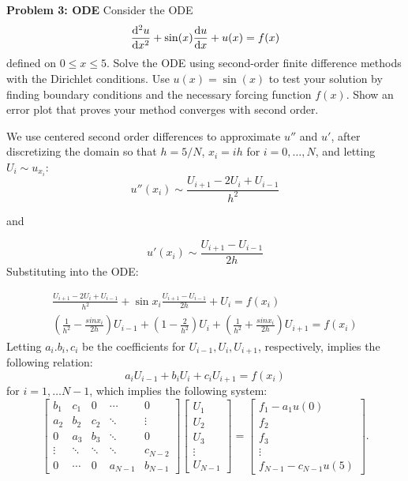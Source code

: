 \documentclass[12pt]{article}
\begin{document}
\noindent \textbf{Problem 3: ODE}
Consider the ODE
$$\dv[2]{u}{x} + \sin(x) \dv{u}{x} + u(x) = f(x)$$
defined on $0 \leq x \leq 5$. Solve the ODE using second-order finite difference methods with the Dirichlet conditions. Use $u(x) = \sin(x)$ to test your solution by finding boundary conditions and the necessary forcing function $f(x)$. Show an error plot that proves your method converges with second order.

We use centered second order differences to approximate $u''$ and $u'$, after discretizing the domain so that $h = 5/N$, $x_{i} = ih$ for $i = 0,\dots, N$, and letting $U_{i} \sim u_{x_{i}}$:
\[
  u''(x_{i}) \sim \frac{U_{i+1}-2U_{i}+U_{i-1}}{h^{2}}
\]

and

\[
  u'(x_{i})\sim \frac{U_{i+1}-U_{i-1}}{2h}
\]
Substituting into the ODE:

\begin{align*}
  \frac{U_{i+1}-2U_{i}+U_{i-1}}{h^{2}}+\sin x_{i}\frac{U_{i+1}-U_{i-1}}{2h}+U_{i} = f(x_{i}) \\
  (\frac{1}{h^{2}}-\frac{sin x_{i}}{2h})U_{i-1}+(1-\frac{2}{h^{2}})U_{i}+(\frac{1}{h^{2}}+\frac{sin x_{i}}{2h})U_{i+1} = f(x_{i})
\end{align*}
Letting $a_{i}.b_{i},c_{i}$ be the coefficients for $U_{i-1},U_{i},U_{i+1}$, respectively, implies the following relation:
\[
  a_{i}U_{i-1}+b_{i}U_{i}+c_{i}U_{i+1} = f(x_{i})
\]
for $i = 1, \dots N-1$, which implies the following system:
\[
\begin{bmatrix}
b_1 & c_1 & 0 & \cdots & 0 \\
a_2 & b_2 & c_2 & \ddots & \vdots \\
0 & a_3 & b_3 & \ddots & 0 \\
\vdots & \ddots & \ddots & \ddots & c_{N-2} \\
0 & \cdots & 0 & a_{N-1} & b_{N-1}
\end{bmatrix}
\begin{bmatrix}
U_1 \\
U_2 \\
U_3 \\
\vdots \\
U_{N-1}
\end{bmatrix}
=
\begin{bmatrix}
f_1 - a_{1}u(0) \\
f_2 \\
f_3 \\
\vdots \\
f_{N-1} - c_{N-1}u(5)
\end{bmatrix}.
\]
\end{document}
